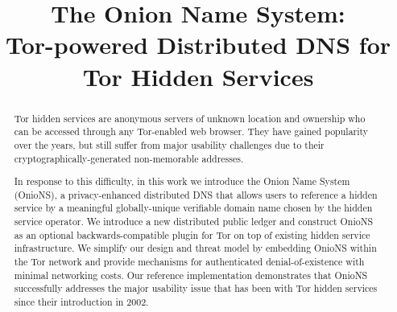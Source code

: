 \documentclass[conference]{IEEEtran}
\begin{document}
\title{The Onion Name System: \\ \huge Tor-powered Distributed DNS for Tor Hidden Services}

\author{
	\and
	\and
}

\IEEEoverridecommandlockouts
\makeatletter{}\makeatother
{}


\maketitle

\begin{abstract}

Tor hidden services are anonymous servers of unknown location and ownership who can be accessed through any Tor-enabled web browser. They have gained popularity over the years, but still suffer from major usability challenges due to their cryptographically-generated non-memorable addresses.

In response to this difficulty, in this work we introduce the Onion Name System (OnioNS), a privacy-enhanced distributed DNS that allows users to reference a hidden service by a meaningful globally-unique verifiable domain name chosen by the hidden service operator. We introduce a new distributed public ledger and construct OnioNS as an optional backwards-compatible plugin for Tor on top of existing hidden service infrastructure. We simplify our design and threat model by embedding OnioNS within the Tor network and provide mechanisms for authenticated denial-of-existence with minimal networking costs. Our reference implementation demonstrates that OnioNS successfully addresses the major usability issue that has been with Tor hidden services since their introduction in 2002.

\end{abstract}
\end{document}
